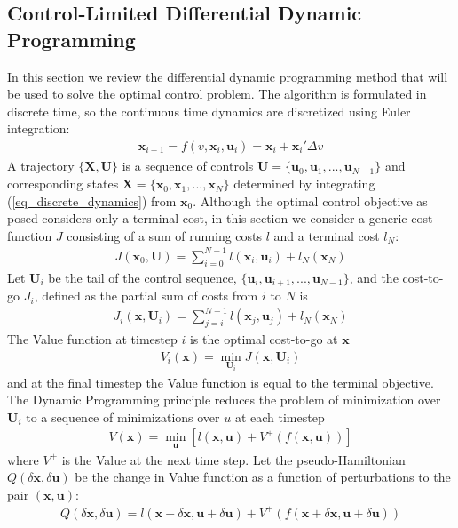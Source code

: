 \documentclass[journal ]{new-aiaa}
\newcommand{\state}{\ensuremath{\mathbf{x}}}
\newcommand{\control}{\ensuremath{\mathbf{u}}}
\newcommand{\State}{\ensuremath{\mathbf{X}}}
\newcommand{\Control}{\ensuremath{\mathbf{U}}}
\begin{document}
\subsection*{Control-Limited Differential Dynamic Programming}
In this section we review the differential dynamic programming method that will be used to solve the optimal control problem. 
The algorithm is formulated in discrete time, so the continuous time dynamics are discretized using Euler integration:
\begin{align}
\state_{i+1} = f(v, \state_i,\control_i) = \state_i + \state_i'\Delta v \label{eq_discrete_dynamics}
\end{align}
A trajectory $\{\State,\Control\}$ is a sequence of controls $ \Control=\{\control_0,\control_1,...,\control_{N-1}\} $ and corresponding states $\State=\{\state_0,\state_1,...,\state_N\}$ determined by integrating (\ref{eq_discrete_dynamics}) from $\state_0$.
Although the optimal control objective as posed considers only a terminal cost, in this section we consider a generic cost function $J$ consisting of a sum of running costs $l$ and a terminal cost $l_N$:
\begin{align}
J(\state_0,\Control) = \sum_{i=0}^{N-1}l(\state_i,\control_i) + l_N(\state_N)
\end{align}
Let $\Control_i$ be the tail of the control sequence, $\{\control_i,\control_{i+1},...,\control_{N-1}\}$, and the cost-to-go $J_i$, defined as the partial sum of costs from $i$ to $N$ is
\begin{align}
J_i(\state,\Control_i) = \sum_{j=i}^{N-1}l(\state_j,\control_j) + l_N(\state_N)
\end{align}
The Value function at timestep $i$ is the optimal cost-to-go at \state
\begin{align}
V_i(\state) = \min_{\Control_i} J(\state, \Control_i)
\end{align}
and at the final timestep the Value function is equal to the terminal objective. The Dynamic Programming principle reduces the problem of minimization over $\Control_i$ to a sequence of minimizations over $u$ at each timestep 
\begin{align}
V(\state) = \min_{\control}\left[l(\state,\control) + V^+(f(\state,\control))\right] \label{eq_dynamic_programming}
\end{align}
where $V^+$ is the Value at the next time step.
Let the pseudo-Hamiltonian $Q(\delta\state,\delta\control)$ be the change in Value function as a function of perturbations to the pair $(\state,\control)$:
\begin{align}
Q(\delta\state,\delta\control) = l(\state+\delta\state,\control+\delta\control) + V^+(f(\state+\delta\state,\control+\delta\control))
\end{align}
\end{document}
